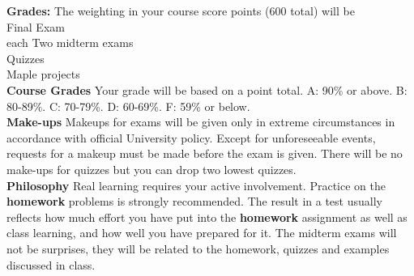 \documentclass[11pt]{article}
\newcommand{\nd}{\noindent}
\begin{document}
{\bigskip
\noindent
{\bf Grades:}  %
  The weighting in your course score points (600 total) will be\\
\hspace*{.29635in}    Final Exam  \\
\hspace*{.29635in}  each   Two midterm exams\\
\hspace*{.29635in}    Quizzes\\
\hspace*{.29635in}    Maple projects\\


\nd
{\bf Course Grades} Your grade will be based on a point total.   A: 90\% or above.    
B: 80-89\%.   C: 70-79\%.   D: 60-69\%.    F: 59\% or below. \\

\nd
{\bf Make-ups}  Makeups for exams will be given only in extreme circumstances in accordance with official University policy. Except for unforeseeable events, requests for a makeup must be made before the exam is given. There will be no make-ups for quizzes but you can drop two lowest quizzes. \\


\nd
{\bf Philosophy}   Real learning requires your active involvement. Practice on the 
{\bf homework} problems is strongly recommended. The result in a test usually reflects how much effort you have put into the {\bf homework} assignment as well as class learning, and how well you have prepared for it. The midterm exams will not be surprises, they will be related to the homework, quizzes and examples discussed in class. 

}
\end{document}
